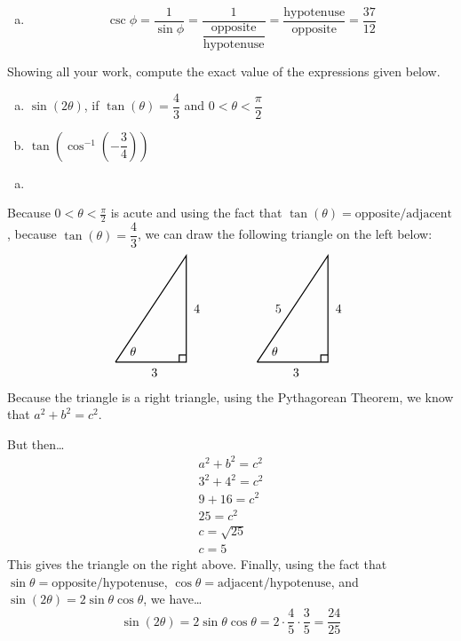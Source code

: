 \documentclass[12pt,letterpaper]{exam}
\begin{document}
\begin{questions}
{\begin{enumerate}[(a)]
\item 
	\[
	\csc \phi= \dfrac{1}{\sin \phi}= \dfrac{1}{\dfrac{\text{opposite}}{\text{hypotenuse}}}= \dfrac{\text{hypotenuse}}{\text{opposite}}= \dfrac{37}{12}
	\] 
\end{enumerate}
}



\newpage
\question[10] Showing all your work, compute the exact value of the expressions given below.
	\begin{enumerate}[(a)]
	\item $\sin(2\theta)$, if $\tan(\theta)= \dfrac{4}{3}$ and $0 < \theta < \dfrac{\pi}{2}$
	\item $\tan \!\left( \cos^{-1} \left( -\dfrac{3}{4} \right) \right)$
	\end{enumerate} 

{\itshape \sol 
\begin{enumerate}[(a)]
\item 
\end{enumerate}
\begin{minipage}[c]{0.45\textwidth}
Because $0 < \theta < \frac{\pi}{2}$ is acute and using the fact that $\tan(\theta)= \text{opposite}/\text{adjacent}$, because $\tan(\theta)= \dfrac{4}{3}$, we can draw the following triangle on the left below:
	\[
	\begin{tikzpicture}
	\draw[line width=0.03cm] (0,0) -- (2,0) -- (2,3) -- (0,0);
	\draw[line width=0.03cm] (1.8,0) -- (1.8,0.2) -- (2,0.2);
	\node at (0.5,0.3) {$\theta$};
	\node at (2.3,1.5) {$4$};
	\node at (1.1,-0.3) {$3$};
	
	\tikzset{shift={(4,0)}}
	
	\draw[line width=0.03cm] (0,0) -- (2,0) -- (2,3) -- (0,0);
	\draw[line width=0.03cm] (1.8,0) -- (1.8,0.2) -- (2,0.2);
	\node at (0.5,0.3) {$\theta$};
	\node at (2.3,1.5) {$4$};
	\node at (1.1,-0.3) {$3$};
	\node at (0.6,1.5) {$5$};
	\end{tikzpicture}
	\]
Because the triangle is a right triangle, using the Pythagorean Theorem, we know that $a^2 + b^2= c^2$.
\end{minipage} \hspace{1cm} \begin{minipage}[c]{0.45\textwidth}
But then\dots
	\[
	\begin{gathered}
	a^2 + b^2= c^2 \\
	3^2 + 4^2= c^2 \\
	9 + 16= c^2 \\
	25= c^2 \\
	c= \sqrt{25} \\
	c= 5
	\end{gathered}
	\]
This gives the triangle on the right above. Finally, using the fact that $\sin \theta= \text{opposite}/\text{hypotenuse}$, $\cos \theta= \text{adjacent}/\text{hypotenuse}$, and $\sin(2\theta)= 2 \sin \theta \cos \theta$, we have\dots
	\[
	\sin(2\theta)= 2 \sin \theta \cos \theta= 2 \cdot \dfrac{4}{5} \cdot \dfrac{3}{5}= \dfrac{24}{25}
	\]
\end{minipage} 

}
\end{questions}
\end{document}
